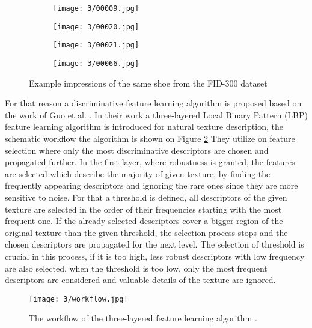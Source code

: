 \documentclass[draft,final]{vutinfth} %
\begin{document}
\begin{figure}[h]
  \centering
  \begin{subfigure}[b]{0.24\columnwidth}
    \centering
    \texttt{[image: 3/00009.jpg]}
  \end{subfigure}
  \begin{subfigure}[b]{0.24\columnwidth}
    \centering
    \texttt{[image: 3/00020.jpg]}
  \end{subfigure}
  \begin{subfigure}[b]{0.24\columnwidth}
    \centering
    \texttt{[image: 3/00021.jpg]}
  \end{subfigure}
  \begin{subfigure}[b]{0.24\columnwidth}
    \centering
    \texttt{[image: 3/00066.jpg]}
  \end{subfigure}
  \caption{Example impressions of the same shoe from the FID-300 \cite{kortylewski2014unsupervised} dataset}
  \label{fig:pe:database}
\end{figure}

\par
For that reason a discriminative feature learning algorithm is proposed based on the work of Guo et al. \cite{guo2012discriminative}.
In their work a three-layered Local Binary Pattern (LBP) feature learning algorithm is introduced for natural texture description, the schematic workflow the algorithm is shown on Figure \ref{fig:pe:workflow}
They utilize on feature selection where only the most discriminative descriptors are chosen and propagated further.
In the first layer, where robustness is granted, the features are selected which describe the majority of given texture, by finding the frequently appearing descriptors and ignoring the rare ones since they are more sensitive to noise.
For that a threshold is defined, all descriptors of the given texture are selected in the order of their frequencies starting with the most frequent one.
If the already selected descriptors cover a bigger region of the original texture than the given threshold, the selection process stops and the chosen descriptors are propagated for the next level.
The selection of threshold is crucial in this process, if it is too high, less robust descriptors with low frequency are also selected, when the threshold is too low, only the most frequent descriptors are considered and valuable details of the texture are ignored.

\begin{figure}[h]
  \centering
  \texttt{[image: 3/workflow.jpg]}
  \caption{The workflow of the three-layered feature learning algorithm  \cite{guo2012discriminative}.}
  \label{fig:pe:workflow} %
\end{figure}
\end{document}
